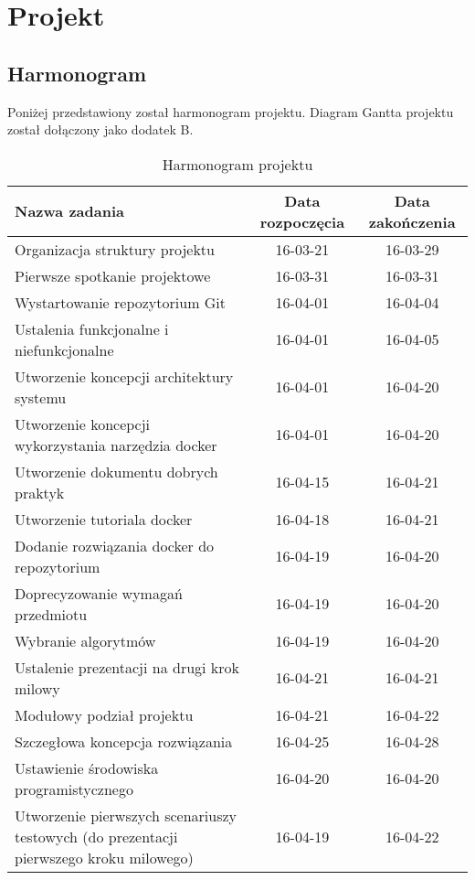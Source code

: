 \chapter{Projekt}


\section{Harmonogram}
Poniżej przedstawiony został harmonogram projektu. Diagram Gantta projektu został dołączony jako dodatek B.
\begin{table}[!h]
\caption{Harmonogram projektu}
\label{tab:harmonogram}
  \begin{center}
  \begin{tabular}{ p{8cm} || c | c }
\textbf{Nazwa zadania} & \textbf{Data rozpoczęcia} & \textbf{Data zakończenia} \\ \hline
Organizacja struktury projektu & 16-03-21 & 16-03-29 \\ \hline
Pierwsze spotkanie projektowe & 16-03-31 & 16-03-31 \\ \hline
Wystartowanie repozytorium Git & 16-04-01 & 16-04-04 \\ \hline
Ustalenia funkcjonalne i niefunkcjonalne & 16-04-01 & 16-04-05 \\ \hline
Utworzenie koncepcji architektury systemu & 16-04-01 & 16-04-20 \\ \hline
Utworzenie koncepcji wykorzystania narzędzia docker & 16-04-01 & 16-04-20 \\ \hline
Utworzenie dokumentu dobrych praktyk & 16-04-15 & 16-04-21 \\ \hline
Utworzenie tutoriala docker & 16-04-18 & 16-04-21 \\ \hline
Dodanie rozwiązania docker do repozytorium & 16-04-19 & 16-04-20 \\ \hline
Doprecyzowanie wymagań przedmiotu & 16-04-19 & 16-04-20 \\ \hline
Wybranie algorytmów & 16-04-19 & 16-04-20 \\ \hline
Ustalenie prezentacji na drugi krok milowy & 16-04-21 & 16-04-21 \\ \hline
Modułowy podział projektu & 16-04-21 & 16-04-22 \\ \hline
Szczegłowa koncepcja rozwiązania & 16-04-25 & 16-04-28 \\ \hline
Ustawienie środowiska programistycznego & 16-04-20 & 16-04-20 \\ \hline
Utworzenie pierwszych scenariuszy testowych (do prezentacji pierwszego kroku milowego) & 16-04-19 & 16-04-22 \\ \hline

\end{tabular}
\end{center}
\end{table}
